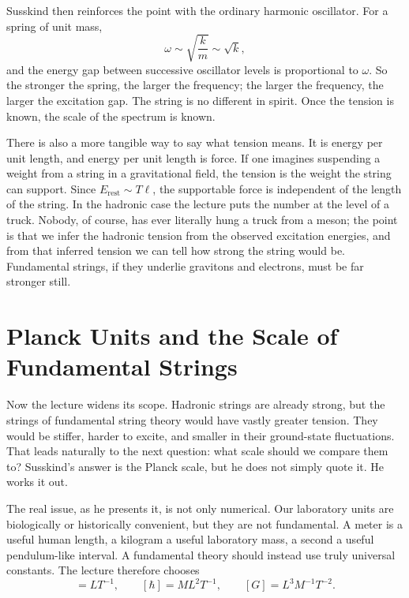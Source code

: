 Susskind then reinforces the point with the ordinary harmonic oscillator. For a spring of unit mass,
\begin{equation}
\omega\sim \sqrt{\frac{k}{m}}\sim \sqrt{k},
\end{equation}
and the energy gap between successive oscillator levels is proportional to \(\omega\). So the stronger the spring, the larger the frequency; the larger the frequency, the larger the excitation gap. The string is no different in spirit. Once the tension is known, the scale of the spectrum is known.

There is also a more tangible way to say what tension means. It is energy per unit length, and energy per unit length is force. If one imagines suspending a weight from a string in a gravitational field, the tension is the weight the string can support. Since \(E_{\text{rest}}\sim T\ell\), the supportable force is independent of the length of the string. In the hadronic case the lecture puts the number at the level of a truck. Nobody, of course, has ever literally hung a truck from a meson; the point is that we infer the hadronic tension from the observed excitation energies, and from that inferred tension we can tell how strong the string would be. Fundamental strings, if they underlie gravitons and electrons, must be far stronger still.

\section{Planck Units and the Scale of Fundamental Strings}

Now the lecture widens its scope. Hadronic strings are already strong, but the strings of fundamental string theory would have vastly greater tension. They would be stiffer, harder to excite, and smaller in their ground-state fluctuations. That leads naturally to the next question: what scale should we compare them to? Susskind's answer is the Planck scale, but he does not simply quote it. He works it out.

The real issue, as he presents it, is not only numerical. Our laboratory units are biologically or historically convenient, but they are not fundamental. A meter is a useful human length, a kilogram a useful laboratory mass, a second a useful pendulum-like interval. A fundamental theory should instead use truly universal constants. The lecture therefore chooses
\begin{equation}
[c]=LT^{-1},
\qquad
[\hbar]=ML^{2}T^{-1},
\qquad
[G]=L^{3}M^{-1}T^{-2}.
\end{equation}

